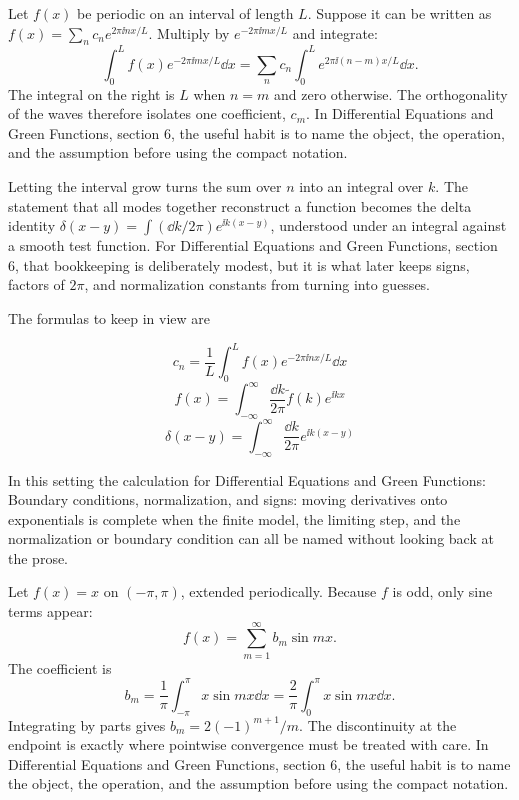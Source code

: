 Let \(f(x)\) be periodic on an interval of length \(L\).  Suppose it can be written as \(f(x)=\sum_n c_ne^{2\pi\ii nx/L}\).  Multiply by \(e^{-2\pi\ii mx/L}\) and integrate:
\[
  \int_0^L f(x)e^{-2\pi\ii mx/L}\dd x
  =
  \sum_n c_n\int_0^L e^{2\pi\ii(n-m)x/L}\dd x.
\]
The integral on the right is \(L\) when \(n=m\) and zero otherwise.  The orthogonality of the waves therefore isolates one coefficient, \(c_m\).  In Differential Equations and Green Functions, section 6, the useful habit is to name the object, the operation, and the assumption before using the compact notation.

Letting the interval grow turns the sum over \(n\) into an integral over \(k\).  The statement that all modes together reconstruct a function becomes the delta identity \(\delta(x-y)=\int(\dd k/2\pi)e^{\ii k(x-y)}\), understood under an integral against a smooth test function.  For Differential Equations and Green Functions, section 6, that bookkeeping is deliberately modest, but it is what later keeps signs, factors of \(2\pi\), and normalization constants from turning into guesses.

The formulas to keep in view are

\[
  c_n=\frac1L\int_0^L f(x)e^{-2\pi\ii nx/L}\dd x
\]
\[
  f(x)=\int_{-\infty}^{\infty}\frac{\dd k}{2\pi}\tilde f(k)e^{\ii kx}
\]
\[
  \delta(x-y)=\int_{-\infty}^{\infty}\frac{\dd k}{2\pi}e^{\ii k(x-y)}
\]

In this setting the calculation for Differential Equations and Green Functions: Boundary conditions, normalization, and signs: moving derivatives onto exponentials is complete when the finite model, the limiting step, and the normalization or boundary condition can all be named without looking back at the prose.




\begin{example}
Let \(f(x)=x\) on \((-\pi,\pi)\), extended periodically.  Because \(f\) is odd, only sine terms appear:
\[
  f(x)=\sum_{m=1}^\infty b_m\sin mx.
\]
The coefficient is
\[
  b_m=\frac1\pi\int_{-\pi}^\pi x\sin mx\dd x
  =\frac2\pi\int_0^\pi x\sin mx\dd x.
\]
Integrating by parts gives \(b_m=2(-1)^{m+1}/m\).  The discontinuity at the endpoint is exactly where pointwise convergence must be treated with care.  In Differential Equations and Green Functions, section 6, the useful habit is to name the object, the operation, and the assumption before using the compact notation.
\end{example}



